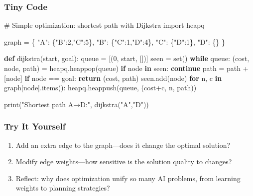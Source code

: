 \documentclass[
  letterpaper,
  DIV=11,
  numbers=noendperiod]{scrreprt}
\newenvironment{Shaded}{\begin{snugshade}}{\end{snugshade}}
\newcommand{\BuiltInTok}[1]{\textcolor[rgb]{0.00,0.23,0.31}{#1}}
\newcommand{\CommentTok}[1]{\textcolor[rgb]{0.37,0.37,0.37}{#1}}
\newcommand{\ControlFlowTok}[1]{\textcolor[rgb]{0.00,0.23,0.31}{\textbf{#1}}}
\newcommand{\DecValTok}[1]{\textcolor[rgb]{0.68,0.00,0.00}{#1}}
\newcommand{\ImportTok}[1]{\textcolor[rgb]{0.00,0.46,0.62}{#1}}
\newcommand{\KeywordTok}[1]{\textcolor[rgb]{0.00,0.23,0.31}{\textbf{#1}}}
\newcommand{\NormalTok}[1]{\textcolor[rgb]{0.00,0.23,0.31}{#1}}
\newcommand{\OperatorTok}[1]{\textcolor[rgb]{0.37,0.37,0.37}{#1}}
\newcommand{\StringTok}[1]{\textcolor[rgb]{0.13,0.47,0.30}{#1}}
\providecommand{\tightlist}{%
  \setlength{\itemsep}{0pt}\setlength{\parskip}{0pt}}
\begin{document}
\subsubsection{Tiny Code}\label{tiny-code-62}

\begin{Shaded}
\begin{Highlighting}[]
\CommentTok{\# Simple optimization: shortest path with Dijkstra}
\ImportTok{import}\NormalTok{ heapq}

\NormalTok{graph }\OperatorTok{=}\NormalTok{ \{}
    \StringTok{"A"}\NormalTok{: \{}\StringTok{"B"}\NormalTok{:}\DecValTok{2}\NormalTok{,}\StringTok{"C"}\NormalTok{:}\DecValTok{5}\NormalTok{\},}
    \StringTok{"B"}\NormalTok{: \{}\StringTok{"C"}\NormalTok{:}\DecValTok{1}\NormalTok{,}\StringTok{"D"}\NormalTok{:}\DecValTok{4}\NormalTok{\},}
    \StringTok{"C"}\NormalTok{: \{}\StringTok{"D"}\NormalTok{:}\DecValTok{1}\NormalTok{\},}
    \StringTok{"D"}\NormalTok{: \{\}}
\NormalTok{\}}

\KeywordTok{def}\NormalTok{ dijkstra(start, goal):}
\NormalTok{    queue }\OperatorTok{=}\NormalTok{ [(}\DecValTok{0}\NormalTok{, start, [])]}
\NormalTok{    seen }\OperatorTok{=} \BuiltInTok{set}\NormalTok{()}
    \ControlFlowTok{while}\NormalTok{ queue:}
\NormalTok{        (cost, node, path) }\OperatorTok{=}\NormalTok{ heapq.heappop(queue)}
        \ControlFlowTok{if}\NormalTok{ node }\KeywordTok{in}\NormalTok{ seen:}
            \ControlFlowTok{continue}
\NormalTok{        path }\OperatorTok{=}\NormalTok{ path }\OperatorTok{+}\NormalTok{ [node]}
        \ControlFlowTok{if}\NormalTok{ node }\OperatorTok{==}\NormalTok{ goal:}
            \ControlFlowTok{return}\NormalTok{ (cost, path)}
\NormalTok{        seen.add(node)}
        \ControlFlowTok{for}\NormalTok{ n, c }\KeywordTok{in}\NormalTok{ graph[node].items():}
\NormalTok{            heapq.heappush(queue, (cost}\OperatorTok{+}\NormalTok{c, n, path))}

\BuiltInTok{print}\NormalTok{(}\StringTok{"Shortest path A→D:"}\NormalTok{, dijkstra(}\StringTok{"A"}\NormalTok{,}\StringTok{"D"}\NormalTok{))}
\end{Highlighting}
\end{Shaded}

\subsubsection{Try It Yourself}\label{try-it-yourself-62}

\begin{enumerate}
\def\labelenumi{\arabic{enumi}.}
\tightlist
\item
  Add an extra edge to the graph---does it change the optimal solution?
\item
  Modify edge weights---how sensitive is the solution quality to
  changes?
\item
  Reflect: why does optimization unify so many AI problems, from
  learning weights to planning strategies?
\end{enumerate}
\end{document}
